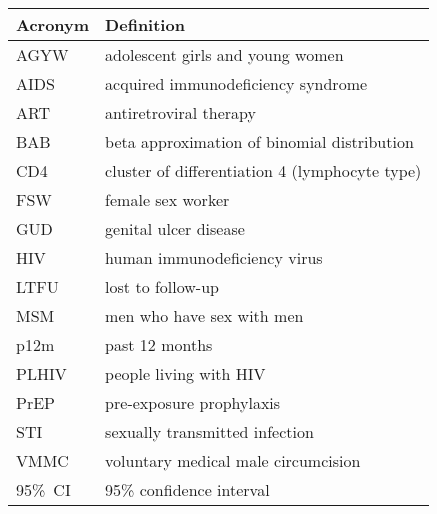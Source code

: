 \begin{tabular}{ll}
  \toprule
  Acronym & Definition \\
  \midrule
  AGYW    & adolescent girls and young women \\
  AIDS    & acquired immunodeficiency syndrome \\
  ART     & antiretroviral therapy \\
  BAB     & beta approximation of binomial distribution \\
  CD4     & cluster of differentiation 4 (lymphocyte type) \\
  FSW     & female sex worker \\
  GUD     & genital ulcer disease \\
  HIV     & human immunodeficiency virus \\
  LTFU    & lost to follow-up \\
  MSM     & men who have sex with men \\
  p12m    & past 12 months \\
  PLHIV   & people living with HIV \\
  PrEP    & pre-exposure prophylaxis \\
  STI     & sexually transmitted infection \\
  VMMC    & voluntary medical male circumcision \\
  95\%~CI & 95\% confidence interval \\
  \bottomrule
\end{tabular}